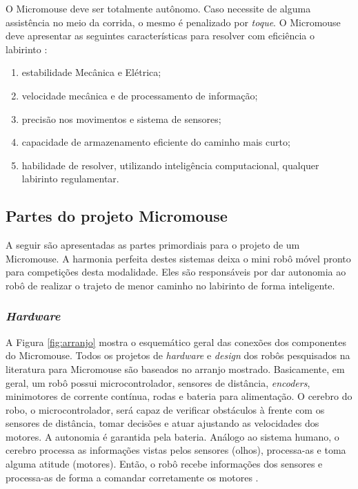 O Micromouse deve ser totalmente autônomo. Caso necessite de alguma assistência no meio da corrida, o mesmo é penalizado por \emph{toque}. O Micromouse deve apresentar as seguintes características para resolver com eficiência o labirinto \cite{7344099}: 

\begin{enumerate}[leftmargin=2cm,label=\alph*)]
\item estabilidade Mecânica e Elétrica;
\item velocidade mecânica e de processamento de informação;
\item precisão nos movimentos e sistema de sensores;
\item capacidade de armazenamento eficiente do caminho mais curto;
\item habilidade de resolver, utilizando inteligência computacional, qualquer labirinto regulamentar.
\end{enumerate}


\subsection{Partes do projeto Micromouse}
A seguir são apresentadas as partes primordiais para o projeto de um Micromouse. A harmonia perfeita destes sistemas deixa o mini robô móvel pronto para competições desta modalidade. Eles são responsáveis por dar autonomia ao robô de realizar o trajeto de menor caminho no labirinto de forma inteligente.

\subsubsection{\textit{Hardware}}
A Figura \ref{fig:arranjo} mostra o esquemático geral das conexões dos componentes do Micromouse. Todos os projetos de \textit{hardware} e \emph{design} dos robôs pesquisados na literatura para Micromouse são baseados no arranjo mostrado. Basicamente, em geral, um robô possui microcontrolador, sensores de distância, \emph{encoders}, minimotores de corrente contínua, rodas e bateria para alimentação. O cerebro do robo, o microcontrolador, será capaz de verificar obstáculos à frente com os sensores de distância, tomar decisões e atuar ajustando as velocidades dos motores. A autonomia é garantida pela bateria. Análogo ao sistema humano, o cerebro processa as informações vistas pelos sensores (olhos), processa-as e toma alguma atitude (motores). Então, o robô recebe informações dos sensores e processa-as de forma a comandar corretamente os motores \cite{yadav:2012}.

